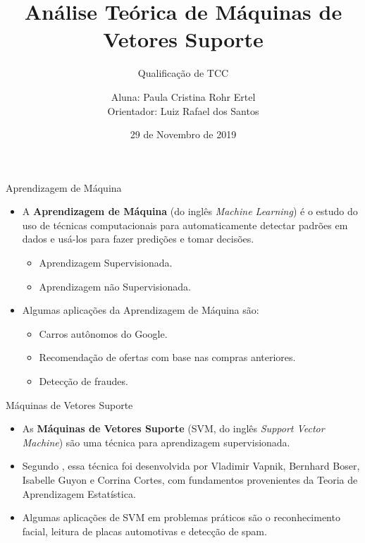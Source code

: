 \documentclass{beamer}
\title[Análise Teórica de SVM]{Análise Teórica de Máquinas de Vetores Suporte}
\subtitle{Qualificação de TCC}
\author[Paula Ertel]{Aluna: Paula Cristina Rohr Ertel \\ Orientador: Luiz Rafael dos Santos}
\institute[UFSC]{Universidade Federal de Santa Catarina - Campus Blumenau}
\date{29 de Novembro de 2019}
\theoremstyle{definition}%
\begin{document}
\begin{frame}
	\maketitle
\end{frame}


\begin{frame}{Aprendizagem de Máquina}
\begin{itemize}
	\item A \textbf{Aprendizagem de Máquina} (do inglês \textit{Machine Learning}) é o estudo do uso de técnicas computacionais para automaticamente detectar padrões em dados e usá-los para fazer predições e tomar decisões.
	\begin{itemize}
		\item Aprendizagem Supervisionada.
		\item Aprendizagem não Supervisionada.	
	\end{itemize}
	\item Algumas aplicações da Aprendizagem de Máquina são:
	\begin{itemize} %
		\item Carros autônomos do Google.
		\item Recomendação de ofertas com base nas compras anteriores.
		\item Detecção de fraudes.
	\end{itemize}
\end{itemize}
\end{frame}


\begin{frame}{Máquinas de Vetores Suporte}
\begin{itemize}
	\item As \textbf{Máquinas de Vetores Suporte} (SVM, do inglês \textit{Support Vector Machine}) são uma técnica para aprendizagem supervisionada.

	\item Segundo \textcite{Evelin2017}, essa técnica foi desenvolvida por Vladimir Vapnik, Bernhard Boser, Isabelle Guyon e Corrina Cortes, com fundamentos provenientes da Teoria de Aprendizagem Estatística.
	
	\item Algumas aplicações de SVM em problemas práticos são o reconhecimento facial, leitura de placas automotivas e detecção de spam.

\end{itemize}
\end{frame}
\end{document}
